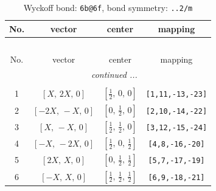 \documentclass[fleqn,8pt]{jsarticle}
\begin{document}
\renewcommand{\arraystretch}{1.2}
\begin{longtable}{cccc}
\caption{Wyckoff bond: {\tt 6b@6f}, bond symmetry: {\tt ..2/m}}
 \\
 \hline \hline
No. & vector & center & mapping \\ \hline \endfirsthead

\multicolumn{3}{l}{\tablename\ \thetable{}} \\
 \hline \hline
No. & vector & center & mapping \\ \hline \endhead

 \hline \hline
\multicolumn{3}{r}{\footnotesize\it continued ...} \\ \endfoot

 \hline \hline
\multicolumn{3}{r}{} \\ \endlastfoot

1 & $\left[ X,\, 2 X,\, 0 \right]$ & $\left[ \frac{1}{2},\, 0,\, 0 \right]$ & {\tt [1,11,-13,-23]} \\ \hline
2 & $\left[ - 2 X,\, - X,\, 0 \right]$ & $\left[ 0,\, \frac{1}{2},\, 0 \right]$ & {\tt [2,10,-14,-22]} \\ \hline
3 & $\left[ X,\, - X,\, 0 \right]$ & $\left[ \frac{1}{2},\, \frac{1}{2},\, 0 \right]$ & {\tt [3,12,-15,-24]} \\ \hline
4 & $\left[ - X,\, - 2 X,\, 0 \right]$ & $\left[ \frac{1}{2},\, 0,\, \frac{1}{2} \right]$ & {\tt [4,8,-16,-20]} \\ \hline
5 & $\left[ 2 X,\, X,\, 0 \right]$ & $\left[ 0,\, \frac{1}{2},\, \frac{1}{2} \right]$ & {\tt [5,7,-17,-19]} \\ \hline
6 & $\left[ - X,\, X,\, 0 \right]$ & $\left[ \frac{1}{2},\, \frac{1}{2},\, \frac{1}{2} \right]$ & {\tt [6,9,-18,-21]} \\
\end{longtable}
\renewcommand{\arraystretch}{1.2}
\end{document}
